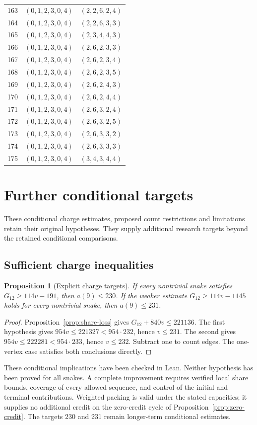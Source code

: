 \documentclass[11pt,a4paper]{article}
\newtheorem{proposition}[theorem]{Proposition}
\theoremstyle{definition}
\theoremstyle{remark}
\begin{document}
\begin{longtable}{rll}
163 & $(0,1,2,3,0,4)$ & $(2,2,6,2,4)$\\
164 & $(0,1,2,3,0,4)$ & $(2,2,6,3,3)$\\
165 & $(0,1,2,3,0,4)$ & $(2,3,4,4,3)$\\
166 & $(0,1,2,3,0,4)$ & $(2,6,2,3,3)$\\
167 & $(0,1,2,3,0,4)$ & $(2,6,2,3,4)$\\
168 & $(0,1,2,3,0,4)$ & $(2,6,2,3,5)$\\
169 & $(0,1,2,3,0,4)$ & $(2,6,2,4,3)$\\
170 & $(0,1,2,3,0,4)$ & $(2,6,2,4,4)$\\
171 & $(0,1,2,3,0,4)$ & $(2,6,3,2,4)$\\
172 & $(0,1,2,3,0,4)$ & $(2,6,3,2,5)$\\
173 & $(0,1,2,3,0,4)$ & $(2,6,3,3,2)$\\
174 & $(0,1,2,3,0,4)$ & $(2,6,3,3,3)$\\
175 & $(0,1,2,3,0,4)$ & $(3,4,3,4,4)$\\
\end{longtable}

\section{Further conditional targets}\label{app:research-targets}
These conditional charge estimates, proposed count restrictions and
limitations retain their original hypotheses. They supply additional
research targets beyond the retained conditional comparisons.

\subsection{Sufficient charge inequalities}
\begin{proposition}[Explicit charge targets]\label{prop:charge-targets}
If every nontrivial snake satisfies $G_{12}\ge114v-191$, then $a(9)\le230$. If the weaker estimate $G_{12}\ge114v-1145$ holds for every nontrivial snake, then $a(9)\le231$.
\end{proposition}
\begin{proof}
Proposition~\ref{prop:share-loss} gives $G_{12}+840v\le221136$. The first hypothesis gives $954v\le221327<954\cdot232$, hence $v\le231$. The second gives $954v\le222281<954\cdot233$, hence $v\le232$. Subtract one to count edges. The one-vertex case satisfies both conclusions directly.
\end{proof}
These conditional implications have been checked in Lean. Neither hypothesis has been proved for all snakes. A complete improvement requires verified local share bounds, coverage of every allowed sequence, and control of the initial and terminal contributions. Weighted packing is valid under the stated capacities; it supplies no additional credit on the zero-credit cycle of Proposition~\ref{prop:zero-credit}. The targets 230 and 231 remain longer-term conditional estimates.
\end{document}

